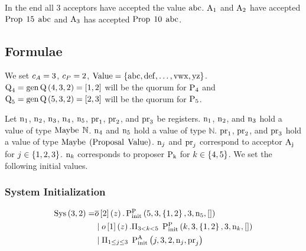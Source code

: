 In the end all $3$ acceptors have accepted the value $\operatorname{abc}$.
$\operatorname{A_{1}}$ and $\operatorname{A_{2}}$ have accepted $\operatorname{Prop}\; 15\; \operatorname{abc}$ and $\operatorname{A_{3}}$ has accepted $\operatorname{Prop}\; 10\; \operatorname{abc}$.

\subsection{Formulae}
We set $c_A = 3$, $c_P = 2$,
$\operatorname{Value}=\left\{\operatorname{abc}, \operatorname{def}, \ldots, \operatorname{vwx}, \operatorname{yz}\right\}$.
$\operatorname{Q}_4 = \operatorname{gen\operatorname{Q}}\left(4, 3, 2\right) = \left[1,2\right]$ will be the quorum for $\operatorname{P_{4}}$ and $\operatorname{Q}_5 = \operatorname{gen\operatorname{Q}}\left(5, 3, 2\right) = \left[2,3\right]$ will be the quorum for $\operatorname{P_{5}}$.

Let $\operatorname{n}_1$, $\operatorname{n}_2$, $\operatorname{n}_3$, $\operatorname{n}_4$, $\operatorname{n}_5$, $\operatorname{pr}_1$, $\operatorname{pr}_2$, and $\operatorname{pr}_3$ be registers.
$\operatorname{n}_1$, $\operatorname{n}_2$, and $\operatorname{n}_3$ hold a value of type $\operatorname{Maybe}\; \mathbb{N}$.
$\operatorname{n}_4$ and $\operatorname{n}_5$ hold a value of type $\mathbb{N}$.
$\operatorname{pr}_1$, $\operatorname{pr}_2$, and $\operatorname{pr}_3$ hold a value of type $\operatorname{Maybe}\; \left(\operatorname{Proposal}\; \operatorname{Value}\right)$.
$\operatorname{n}_{j}$ and $\operatorname{pr}_{j}$ correspond to acceptor $\operatorname{A_{j}}$ for $j \in \left\{1, 2, 3\right\}$.
$\operatorname{n}_{k}$ corresponds to proposer $\operatorname{P_{k}}$ for $k \in \left\{4, 5\right\}$.
We set the following initial values.


\subsubsection{System Initialization}
\begin{align*}
\operatorname{Sys}\left(3, 2\right) =
&
    \overline{o}\left[2\right]\left(z\right).
    \textstyle\operatorname{P^{P}_{init}}\left(5, 3, \left\{1, 2\right\}, 3, \operatorname{n}_5, \mathtt{[]}\right)
    \\
&\; | \;
    o\left[1\right]\left(z\right).
    \Pi_{3 < k < 5}\;
    \textstyle\operatorname{P^{P}_{init}}\left(k, 3, \left\{1, 2\right\}, 3, \operatorname{n}_{k}, \mathtt{[]}\right)
    \\
&\; | \;
    \Pi_{1 \le j \le 3}\;
    \operatorname{P^{A}_{init}}\left(j, 3, 2, \operatorname{n}_{j}, \operatorname{pr}_{j}\right)
\end{align*}


